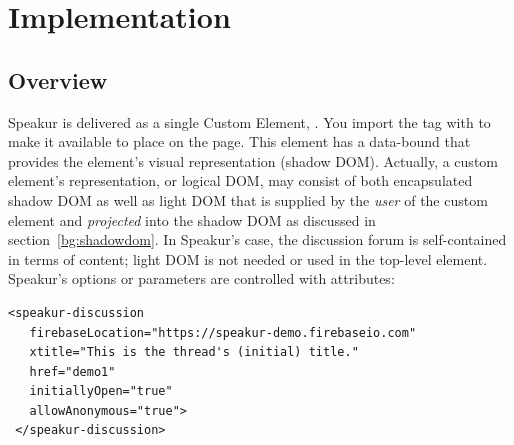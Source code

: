 \chapter{Implementation}
%

\section{Overview}
Speakur is delivered as a single Custom Element, .
You import the tag with  to make it available to place on the page. 
This element has a data-bound  that provides the element's visual representation (shadow DOM).
Actually, a custom element's representation, or logical DOM, may consist of both encapsulated shadow DOM as well as light DOM that is supplied by the \textit{user} of the custom element and \textit{projected} into the shadow DOM as discussed in section~\ref{bg:shadowdom}.
In Speakur's case, the discussion forum is self-contained in terms of content; light DOM is not needed or used in the top-level element.
Speakur's options or parameters are controlled with attributes:

\begin{lstlisting}[language=HTML5,caption=
{Using HTML attributes to set Speakur options},label=l:options1,captionpos=below]
 <speakur-discussion
   firebaseLocation="https://speakur-demo.firebaseio.com"
   xtitle="This is the thread's (initial) title."
   href="demo1"
   initiallyOpen="true"
   allowAnonymous="true">
 </speakur-discussion>
\end{lstlisting}



